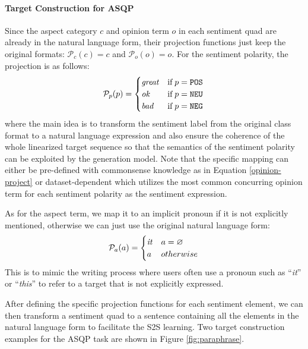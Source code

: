 \documentclass[11pt]{article}
\begin{document}
\paragraph{Target Construction for ASQP} 
Since the aspect category $c$ and opinion term $o$ in each sentiment quad are already in the natural language form, their projection functions just keep the original formats: $\mathcal{P}_c(c)=c$ and $\mathcal{P}_o(o)=o$. For the sentiment polarity, the projection is as follows:
\begin{equation} \label{opinion-project}
    \mathcal{P}_p(p) =
  \begin{cases}
    \text{\textit{great}}  & \text{if} \; p=\texttt{POS} \\
    \text{\textit{ok}}     & \text{if} \; p=\texttt{NEU} \\
    \text{\textit{bad}}    & \text{if} \; p=\texttt{NEG} \\
  \end{cases} \\
\end{equation}
where the main idea is to transform the sentiment label from the original class format to a natural language expression and also ensure the coherence of the whole linearized target sequence so that the semantics of the sentiment polarity can be exploited by the generation model. Note that the specific mapping can either be pre-defined with commonsense knowledge as in Equation \ref{opinion-project} or dataset-dependent which utilizes the most common concurring opinion term for each sentiment polarity as the sentiment expression.

As for the aspect term, we map it to an implicit pronoun if it is not explicitly mentioned, otherwise we can just use the original natural language form:
\begin{equation}
    \mathcal{P}_a(a) =
  \begin{cases}
    \text{\textit{it}}    & a = \varnothing \\
    a            & otherwise \\
  \end{cases} \\
\end{equation}
This is to mimic the writing process where users often use a pronoun such as ``\textit{it}'' or ``\textit{this}'' to refer to a target that is not explicitly expressed. 

After defining the specific projection functions for each sentiment element, we can then transform a sentiment quad to a sentence containing all the elements in the natural language form to facilitate the S2S learning. Two target construction examples for the ASQP task are shown in Figure \ref{fig:paraphrase}. 
\end{document}
